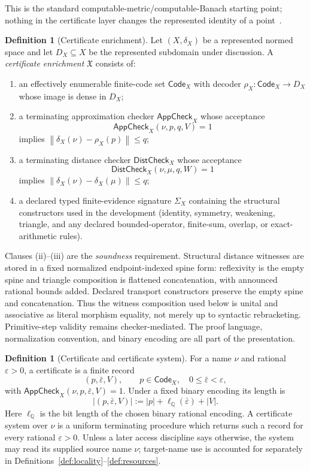 \documentclass[11pt]{article}
\theoremstyle{definition}
\newtheorem{definition}[theorem]{Definition}
\newcommand{\norm}[1]{\left\lVert #1 \right\rVert}
\newcommand{\Q}{\mathbb{Q}}
\newcommand{\Code}{\mathsf{Code}}
\newcommand{\AppCheck}{\mathsf{AppCheck}}
\newcommand{\DistCheck}{\mathsf{DistCheck}}
\begin{document}
This is the standard computable-metric/computable-Banach starting point; nothing in the
certificate layer changes the represented identity of a point~\cite{PourElRichards,Weihrauch}.

\begin{definition}[Certificate enrichment]\label{def:enrichment}
Let $(X,\delta_X)$ be a represented normed space and let $D_X\subseteq X$ be the
represented subdomain under discussion.  A \emph{certificate enrichment}
$\mathfrak X$ consists of:
\begin{enumerate}[label=(\roman*)]
\item an effectively enumerable finite-code set $\Code_X$ with decoder
$\rho_X:\Code_X\to D_X$ whose image is dense in $D_X$;
\item a terminating approximation checker $\AppCheck_X$ whose acceptance
\[
 \AppCheck_X(\nu,p,q,V)=1
\]
implies $\norm{\delta_X(\nu)-\rho_X(p)}\le q$;
\item a terminating distance checker $\DistCheck_X$ whose acceptance
\[
 \DistCheck_X(\nu,\mu,q,W)=1
\]
implies $\norm{\delta_X(\nu)-\delta_X(\mu)}\le q$;
\item a declared typed finite-evidence signature $\Sigma_X$ containing the structural
constructors used in the development (identity, symmetry, weakening, triangle, and any
declared bounded-operator, finite-sum, overlap, or exact-arithmetic rules).
\end{enumerate}
Clauses (ii)--(iii) are the \emph{soundness} requirement.  Structural distance witnesses
are stored in a fixed normalized endpoint-indexed spine form: reflexivity is the empty
spine and triangle composition is flattened concatenation, with announced rational bounds
added.  Declared transport constructors preserve the empty spine and concatenation.  Thus
the witness composition used below is unital and associative as literal morphism equality,
not merely up to syntactic rebracketing.  Primitive-step validity remains checker-mediated.
The proof language, normalization convention, and binary encoding are all part of the
presentation.
\end{definition}

\begin{definition}[Certificate and certificate system]\label{def:certificate}
For a name $\nu$ and rational $\varepsilon>0$, a certificate is a finite record
\[
  (p,\bar\varepsilon,V),\qquad
  p\in\Code_X,\quad 0\le\bar\varepsilon<\varepsilon,
\]
with $\AppCheck_X(\nu,p,\bar\varepsilon,V)=1$.  Under a fixed binary encoding its length is
\[
 |(p,\bar\varepsilon,V)|
 :=|p|+\ell_{\Q}(\bar\varepsilon)+|V|.
\]
Here $\ell_{\Q}$ is the bit length of the chosen binary rational encoding.
A certificate system over $\nu$ is a uniform terminating procedure which returns such a
record for every rational $\varepsilon>0$.  Unless a later access discipline says otherwise,
the system may read its supplied source name $\nu$; target-name use is accounted for
separately in Definitions~\ref{def:locality}--\ref{def:resources}.
\end{definition}
\end{document}

